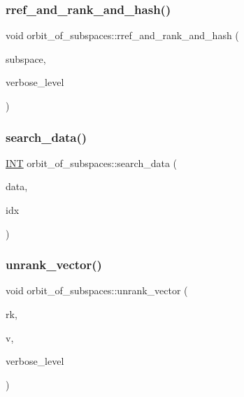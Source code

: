 \subsubsection{\texorpdfstring{rref\+\_\+and\+\_\+rank\+\_\+and\+\_\+hash()}{rref\_and\_rank\_and\_hash()}}
{\footnotesize\ttfamily void orbit\+\_\+of\+\_\+subspaces\+::rref\+\_\+and\+\_\+rank\+\_\+and\+\_\+hash (\begin{DoxyParamCaption}\item[{\mbox{\hyperlink{galois_8h_a09fddde158a3a20bd2dcadb609de11dc}{I\+NT}} $\ast$}]{subspace,  }\item[{\mbox{\hyperlink{galois_8h_a09fddde158a3a20bd2dcadb609de11dc}{I\+NT}}}]{verbose\+\_\+level }\end{DoxyParamCaption})}

\mbox{\label{classorbit__of__subspaces_ae9f5bcb67f33c3ea80a7ce690301dc50}} 
\subsubsection{\texorpdfstring{search\+\_\+data()}{search\_data()}}
{\footnotesize\ttfamily \mbox{\hyperlink{galois_8h_a09fddde158a3a20bd2dcadb609de11dc}{I\+NT}} orbit\+\_\+of\+\_\+subspaces\+::search\+\_\+data (\begin{DoxyParamCaption}\item[{\mbox{\hyperlink{galois_8h_a09fddde158a3a20bd2dcadb609de11dc}{I\+NT}} $\ast$}]{data,  }\item[{\mbox{\hyperlink{galois_8h_a09fddde158a3a20bd2dcadb609de11dc}{I\+NT}} \&}]{idx }\end{DoxyParamCaption})}

\mbox{\label{classorbit__of__subspaces_ae9d77a5ecea190c96ea3efebc50f27a8}} 
\subsubsection{\texorpdfstring{unrank\+\_\+vector()}{unrank\_vector()}}
{\footnotesize\ttfamily void orbit\+\_\+of\+\_\+subspaces\+::unrank\+\_\+vector (\begin{DoxyParamCaption}\item[{\mbox{\hyperlink{galois_8h_a09fddde158a3a20bd2dcadb609de11dc}{I\+NT}}}]{rk,  }\item[{\mbox{\hyperlink{galois_8h_a09fddde158a3a20bd2dcadb609de11dc}{I\+NT}} $\ast$}]{v,  }\item[{\mbox{\hyperlink{galois_8h_a09fddde158a3a20bd2dcadb609de11dc}{I\+NT}}}]{verbose\+\_\+level }\end{DoxyParamCaption})}



